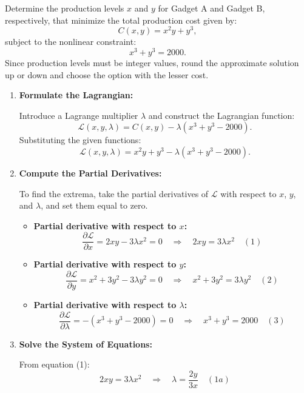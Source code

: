 \exampleline
\begin{example} Determine the production levels \( x \) and \( y \) for Gadget A and Gadget B, respectively, that minimize the total production cost given by:
\[
C(x, y) = x^2 y + y^3,
\]
subject to the nonlinear constraint:
\[
x^3 + y^3 = 2000.
\]
Since production levels must be integer values, round the approximate solution up or down and choose the option with the lesser cost.

\begin{solution}
\begin{enumerate}
    \item \textbf{Formulate the Lagrangian:}
    
    Introduce a Lagrange multiplier \( \lambda \) and construct the Lagrangian function:
    \[
    \mathcal{L}(x, y, \lambda) = C(x, y) - \lambda (x^3 + y^3 - 2000).
    \]
    Substituting the given functions:
    \[
    \mathcal{L}(x, y, \lambda) = x^2 y + y^3 - \lambda (x^3 + y^3 - 2000).
    \]
    
    \item \textbf{Compute the Partial Derivatives:}
    
    To find the extrema, take the partial derivatives of \( \mathcal{L} \) with respect to \( x \), \( y \), and \( \lambda \), and set them equal to zero.
    
    \begin{itemize}
        \item \textbf{Partial derivative with respect to \( x \):}
        \[
        \frac{\partial \mathcal{L}}{\partial x} = 2xy - 3\lambda x^2 = 0 \quad \Rightarrow \quad 2xy = 3\lambda x^2 \quad (1)
        \]
        
        \item \textbf{Partial derivative with respect to \( y \):}
        \[
        \frac{\partial \mathcal{L}}{\partial y} = x^2 + 3y^2 - 3\lambda y^2 = 0 \quad \Rightarrow \quad x^2 + 3y^2 = 3\lambda y^2 \quad (2)
        \]
        
        \item \textbf{Partial derivative with respect to \( \lambda \):}
        \[
        \frac{\partial \mathcal{L}}{\partial \lambda} = -(x^3 + y^3 - 2000) = 0 \quad \Rightarrow \quad x^3 + y^3 = 2000 \quad (3)
        \]
    \end{itemize}
    
    \item \textbf{Solve the System of Equations:}
    
    From equation (1):
    \[
    2xy = 3\lambda x^2 \quad \Rightarrow \quad \lambda = \frac{2y}{3x} \quad (1a)
    \]
    

\end{enumerate}
\end{solution}
\end{example}
